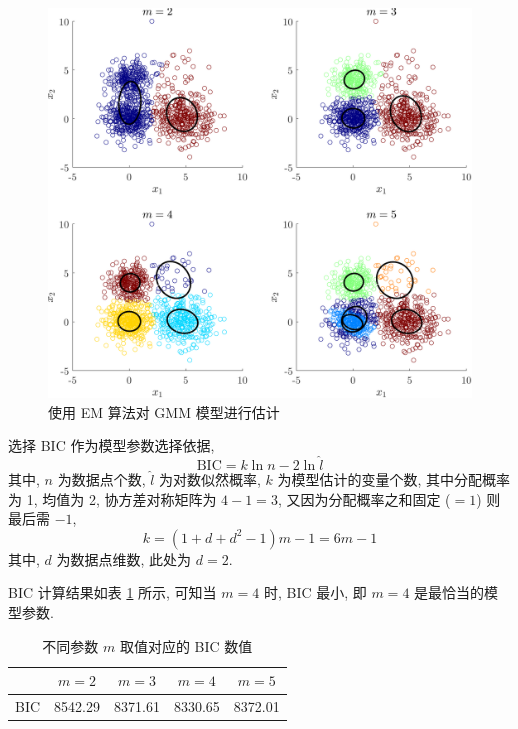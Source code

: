 \documentclass[openany]{ctexbook}
\theoremstyle{kaiti}
\theoremstyle{normal}
\begin{document}
\begin{figure}[htbp]
  \centering
  \includegraphics[width=6in]{gmmem-1.pdf}
  \caption{使用 EM 算法对 GMM 模型进行估计}
  \label{fig:gmmem1}
\end{figure}

选择 BIC 作为模型参数选择依据, 
\begin{equation}
  \mathrm{BIC}=k\ln n-2\ln\hat{l}
\end{equation}
其中, $n$ 为数据点个数, $\hat{l}$ 为对数似然概率, $k$ 为模型估计的变量个数, 其中分配概率为 1, 均值为 2, 协方差对称矩阵为 $4-1=3$, 又因为分配概率之和固定 ($=1$) 则最后需 $-1$,
\begin{equation}
  k=(1+d+d^2-1)m-1=6m-1
\end{equation}
其中, $d$ 为数据点维数, 此处为 $d=2$.

BIC 计算结果如表 \ref{tab:bic} 所示, 可知当 $m=4$ 时, BIC 最小, 即 $m=4$ 是最恰当的模型参数. 

\begin{table}[htbp]
  \centering
  \caption{不同参数 $m$ 取值对应的 BIC 数值}
  \label{tab:bic}
  \begin{tabular}{ccccc}
    \hline
        & $m=2$ & $m=3$ & $m=4$ & $m=5$ \\
    \hline
    BIC & 8542.29 & 8371.61 & 8330.65 & 8372.01\\
    \hline
  \end{tabular}
\end{table}
\end{document}
